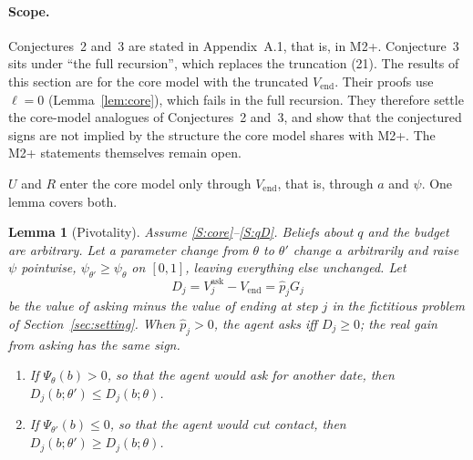 \documentclass[11pt,a4paper]{article}
\newtheorem{lemma}[theorem]{Lemma}
\theoremstyle{definition}
\theoremstyle{remark}
\newcommand{\Vend}{V_{\mathrm{end}}}
\newcommand{\pp}{\hat p}
\begin{document}
\paragraph{Scope.} Conjectures~2 and~3 are stated in Appendix~A.1, that is, in M2+. Conjecture~3 sits under ``the full recursion'', which replaces the truncation (21). The results of this section are for the core model with the truncated $\Vend$. Their proofs use $\ell=0$ (Lemma~\ref{lem:core}), which fails in the full recursion. They therefore settle the core-model analogues of Conjectures~2 and~3, and show that the conjectured signs are not implied by the structure the core model shares with M2+. The M2+ statements themselves remain open.

$U$ and $R$ enter the core model only through $\Vend$, that is, through $a$ and $\psi$. One lemma covers both.

\begin{lemma}[Pivotality]\label{lem:pivot}
Assume \ref{S:core}--\ref{S:qD}. Beliefs about $q$ and the budget are arbitrary. Let a parameter change from $\theta$ to $\theta'$ change $a$ arbitrarily and raise $\psi$ pointwise, $\psi_{\theta'}\ge\psi_\theta$ on $[0,1]$, leaving everything else unchanged. Let
\[
D_j=V^{\mathrm{ask}}_j-\Vend=\pp_jG_j
\]
be the value of asking minus the value of ending at step $j$ in the fictitious problem of Section~\ref{sec:setting}. When $\pp_j>0$, the agent asks iff $D_j\ge0$; the real gain from asking has the same sign.
\begin{enumerate}[label=(\roman*)]
\item If $\Psi_\theta(b)>0$, so that the agent would ask for another date, then $D_j(b;\theta')\le D_j(b;\theta)$.
\item If $\Psi_{\theta'}(b)\le0$, so that the agent would cut contact, then $D_j(b;\theta')\ge D_j(b;\theta)$.
\end{enumerate}
\end{lemma}
\end{document}
